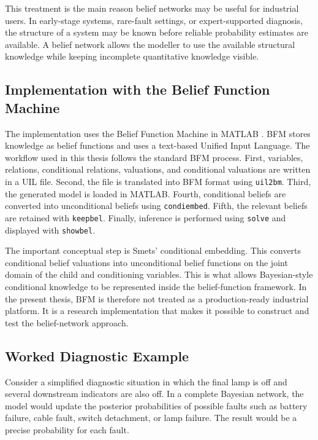 \documentclass[runningheads]{llncs}
\begin{document}
This treatment is the main reason belief networks may be useful for industrial users. In early-stage systems, rare-fault settings, or expert-supported diagnosis, the structure of a system may be known before reliable probability estimates are available. A belief network allows the modeller to use the available structural knowledge while keeping incomplete quantitative knowledge visible.

\subsection{Implementation with the Belief Function Machine}
\label{sec:implementation_bfm}

The implementation uses the Belief Function Machine in MATLAB \cite{GiangShenoy2003BFM}. BFM stores knowledge as belief functions and uses a text-based Unified Input Language. The workflow used in this thesis follows the standard BFM process. First, variables, relations, conditional relations, valuations, and conditional valuations are written in a UIL file. Second, the file is translated into BFM format using \texttt{uil2bm}. Third, the generated model is loaded in MATLAB. Fourth, conditional beliefs are converted into unconditional beliefs using \texttt{condiembed}. Fifth, the relevant beliefs are retained with \texttt{keepbel}. Finally, inference is performed using \texttt{solve} and displayed with \texttt{showbel}.

The important conceptual step is Smets' conditional embedding. This converts conditional belief valuations into unconditional belief functions on the joint domain of the child and conditioning variables. This is what allows Bayesian-style conditional knowledge to be represented inside the belief-function framework. In the present thesis, BFM is therefore not treated as a production-ready industrial platform. It is a research implementation that makes it possible to construct and test the belief-network approach.

\subsection{Worked Diagnostic Example}
\label{sec:worked_diagnostic_example}

Consider a simplified diagnostic situation in which the final lamp is off and several downstream indicators are also off. In a complete Bayesian network, the model would update the posterior probabilities of possible faults such as battery failure, cable fault, switch detachment, or lamp failure. The result would be a precise probability for each fault.
\end{document}
